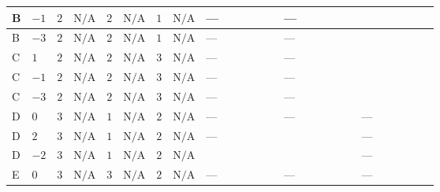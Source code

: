 \documentclass[8pt]{article}
\begin{document}
\begin{landscape}
\begin{longtable}{@{}llcccccc >{\raggedright\arraybackslash}p{0.21\linewidth} >{\raggedright\arraybackslash}p{0.21\linewidth} >{\raggedright\arraybackslash}p{0.21\linewidth}@{}}
\midrule
B & $-1$ & $2$ & $\text{N/A}$ & $2$ & $\text{N/A}$ & $1$ & $\text{N/A}$ & --- & --- & \scriptsize\adjustbox{max width=\linewidth}{$\begin{gathered} +\frac{9 {g_2}^4}{4}\end{gathered}$} \\
\midrule
B & $-3$ & $2$ & $\text{N/A}$ & $2$ & $\text{N/A}$ & $1$ & $\text{N/A}$ & --- & --- & \scriptsize\adjustbox{max width=\linewidth}{$\begin{gathered} +\frac{9 {g_2}^4}{4}\end{gathered}$} \\
\midrule
C & $1$ & $2$ & $\text{N/A}$ & $2$ & $\text{N/A}$ & $3$ & $\text{N/A}$ & --- & --- & \scriptsize\adjustbox{max width=\linewidth}{$\begin{gathered} +\frac{9 {g_2}^4}{4}\end{gathered}$} \\
\midrule
C & $-1$ & $2$ & $\text{N/A}$ & $2$ & $\text{N/A}$ & $3$ & $\text{N/A}$ & --- & --- & \scriptsize\adjustbox{max width=\linewidth}{$\begin{gathered} +\frac{9 {g_2}^4}{4}\end{gathered}$} \\
\midrule
C & $-3$ & $2$ & $\text{N/A}$ & $2$ & $\text{N/A}$ & $3$ & $\text{N/A}$ & --- & --- & \scriptsize\adjustbox{max width=\linewidth}{$\begin{gathered} +\frac{9 {g_2}^4}{4}\end{gathered}$} \\
\midrule
D & $0$ & $3$ & $\text{N/A}$ & $1$ & $\text{N/A}$ & $2$ & $\text{N/A}$ & --- & --- & --- \\
\midrule
D & $2$ & $3$ & $\text{N/A}$ & $1$ & $\text{N/A}$ & $2$ & $\text{N/A}$ & --- & \scriptsize\adjustbox{max width=\linewidth}{$\begin{gathered} +3 {g_1}^4\end{gathered}$} & --- \\
\midrule
D & $-2$ & $3$ & $\text{N/A}$ & $1$ & $\text{N/A}$ & $2$ & $\text{N/A}$ & \scriptsize\adjustbox{max width=\linewidth}{$\begin{gathered} +4 {\lambda_{X_{7}}^{(1)}} \left({\lambda_{X_{16}}}\right)^{*}\end{gathered}$} & \scriptsize\adjustbox{max width=\linewidth}{$\begin{gathered} +3 {g_1}^4\end{gathered}$} & --- \\
\midrule
E & $0$ & $3$ & $\text{N/A}$ & $3$ & $\text{N/A}$ & $2$ & $\text{N/A}$ & --- & --- & --- \\

\end{longtable}
\end{landscape}
\end{document}

